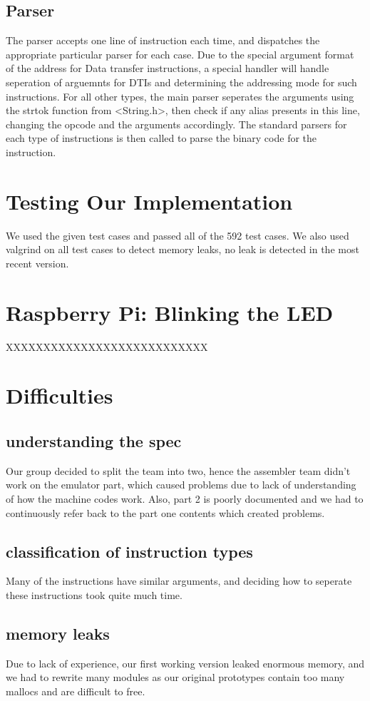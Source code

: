 \documentclass[11pt]{article}
\begin{document}
\subsection{Parser}
The parser accepts one line of instruction each time, and dispatches the appropriate particular parser for each case.
Due to the special argument format of the address for Data transfer instructions, a special handler will handle seperation 
of arguemnts for DTIs and determining the addressing mode for such instructions. For all other types, the main parser seperates 
the arguments using the strtok function from <String.h>, then check if any alias presents in this line, changing the 
opcode and the arguments accordingly. The standard parsers for each type of instructions is then called to parse the binary 
code for the instruction.

\section{Testing Our Implementation}
We used the given test cases and passed all of the 592 test cases.
We also used valgrind on all test cases to detect memory leaks, no leak is detected in the most recent version.

\section{Raspberry Pi: Blinking the LED}
XXXXXXXXXXXXXXXXXXXXXXXXXXX

\section{Difficulties}
\subsection{understanding the spec}
Our group decided to split the team into two, hence the assembler team didn't work on the emulator part, which caused problems due to lack of understanding of how the machine codes work.
Also, part 2 is poorly documented and we had to continuously refer back to the part one contents which created problems.
\subsection{classification of instruction types}
Many of the instructions have similar arguments, and deciding how to seperate these instructions took quite much time.
\subsection{memory leaks}
Due to lack of experience, our first working version leaked enormous memory, and we had to rewrite many modules as our original prototypes contain too many mallocs and are difficult to free.
\end{document}
